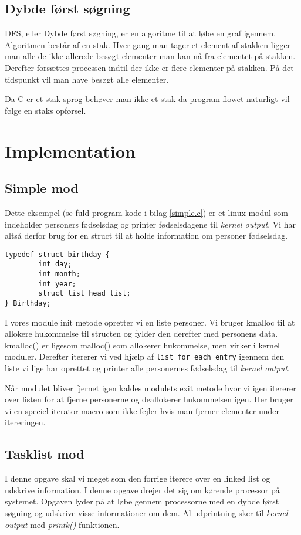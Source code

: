 \documentclass[danish]{report}
\begin{document}
\section{Dybde først søgning}
DFS, eller Dybde først søgning, er en algoritme til at løbe en graf igennem. Algoritmen består af en stak. Hver gang man tager et element af stakken ligger man alle de ikke allerede besøgt elementer man kan nå fra elementet på stakken. Derefter forsættes processen indtil der ikke er flere elementer på stakken. På det tidspunkt vil man have besøgt alle elementer.

Da C er et stak sprog behøver man ikke et stak da program flowet naturligt vil følge en staks opførsel.


\chapter{Implementation}
\begingroup
\let\clearpage\relax
\section{Simple mod}

Dette eksempel (se fuld program kode i bilag \ref{simple.c}) er et linux modul som indeholder personers fødselsdag og printer fødselsdagene til \textit{kernel output}. Vi har altså derfor brug for en struct til at holde information om personer fødselsdag.

\begin{lstlisting}
typedef struct birthday {
        int day;
        int month;
        int year;
        struct list_head list;
} Birthday;
\end{lstlisting}

I vores module init metode opretter vi en liste personer. Vi bruger kmalloc til at allokere hukommelse til structen og fylder den derefter med personens data. kmalloc() er ligesom malloc() som allokerer hukommelse, men virker i kernel moduler. Derefter itererer vi ved hjælp af \texttt{list\_for\_each\_entry} igennem den liste vi lige har oprettet og printer alle personernes fødselsdag til \textit{kernel output}.

Når modulet bliver fjernet igen kaldes modulets exit metode hvor vi igen itererer over listen for at fjerne personerne og deallokerer hukommelsen igen. Her bruger vi en speciel iterator macro som ikke fejler hvis man fjerner elementer under itereringen.

\section{Tasklist mod}
I denne opgave skal vi meget som den forrige iterere over en linked list og udskrive information. I denne opgave drejer det sig om kørende processor på systemet. Opgaven lyder på at løbe gennem processorne med en dybde først søgning og udskrive visse informationer om dem. Al udprintning sker til \textit{kernel output} med \textit{printk()} funktionen.
\end{document}
